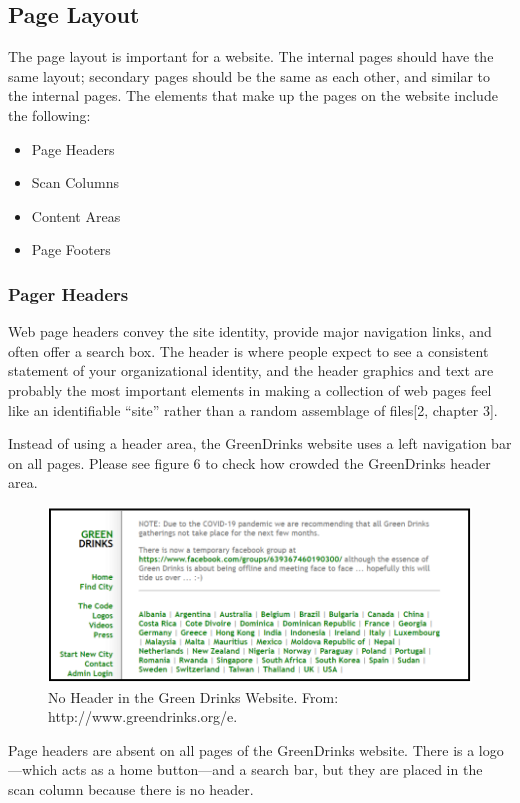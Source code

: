 \documentclass[12pt]{article}
\begin{document}
\subsection*{Page Layout }
The page layout is important for a website. The internal pages should have the same layout; secondary pages should be the same as each other, and similar to the internal pages. The  elements that make up the pages on the website include the following:
\begin{itemize}
\item Page Headers
\item Scan Columns
\item Content Areas
\item Page Footers
\end{itemize}

\subsubsection*{Pager Headers}
Web page headers convey the site identity, provide major navigation links, and often offer a search box. The header is where people expect to see a consistent statement of your organizational identity, and the header graphics and text are probably the most important elements in making a collection of web pages feel like an identifiable “site” rather than a random assemblage of files[2, chapter 3].

Instead of using a header area, the GreenDrinks website uses a left navigation bar on all pages. Please see figure 6 to check how crowded the GreenDrinks header area.
\begin{figure}[ht]
\centering
\includegraphics[width=1.0\textwidth]{f6}
\caption[No Header in the Green Drinks Website.]{No Header in the Green Drinks Website.  From: http://www.greendrinks.org/e\footnotemark.}
\end{figure}
 
Page headers are absent on all pages of the GreenDrinks website. There is a logo—which acts as a home button—and a search bar, but they are placed in the scan column because there is no header.
\end{document}
